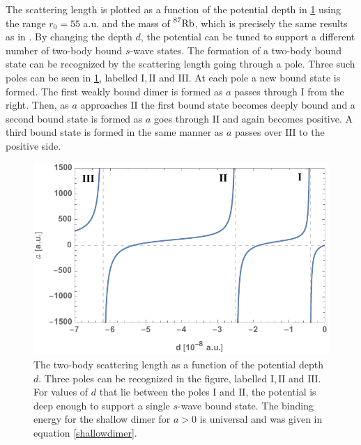 The scattering length is plotted as a function of the potential depth in \cref{fig:res_1} using the range $r_0=55 $ a.u. and the mass of $ \prescript{87}{}{\mathrm{Rb}}$, which is precisely the same results as in \cite{Blume2002}. By changing the depth $d$, the potential can be tuned to support a different number of two-body bound $s$-wave states. The formation of a two-body bound state can be recognized by the scattering length going through a pole. Three such poles can be seen in \cref{fig:res_1}, labelled $\mathrm{I},\mathrm{II}$ and $\mathrm{III}$. At each pole a new bound state is formed. The first weakly bound dimer is formed as $a$ passes through $\mathrm{I}$ from the right. Then, as $a$ approaches $\mathrm{II}$ the first bound state becomes deeply bound and a second bound state is formed as $a$ goes through $\mathrm{II}$ and again becomes positive. A third bound state is formed in the same manner as $a$ passes over $\mathrm{III}$ to the positive side.

\begin{figure}[b!]
	\includegraphics[width=\linewidth]{scatteringlength.pdf}
	\caption{The two-body scattering length as a function of the potential depth $d$. Three poles can be recognized in the figure, labelled $\mathrm{I},\mathrm{II}$ and $\mathrm{III}$. For values of $d$ that lie between the poles $\mathrm{I}$ and $\mathrm{II}$, the potential is deep enough to support a single $s$-wave bound state. The binding energy for the shallow dimer for $a>0$ is universal and was given in equation \eqref{shallowdimer}.}
	\label{fig:res_1}
\end{figure}